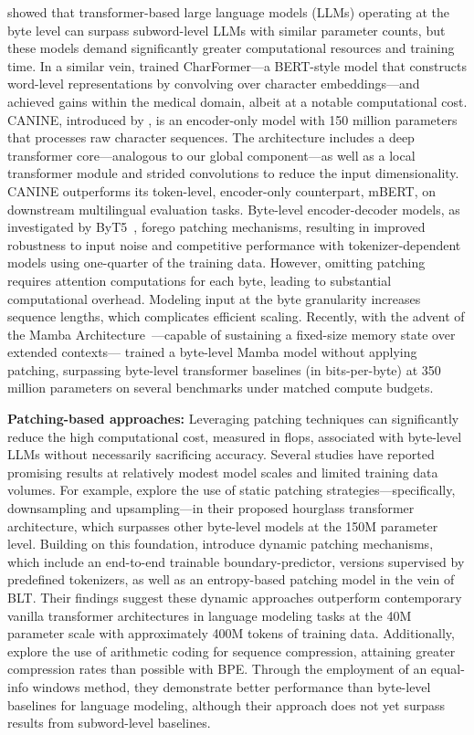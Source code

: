 \cite{Choe2019BridgingTG} showed that transformer-based large language models (LLMs) operating at the byte level can surpass subword-level LLMs with similar parameter counts, but these models demand significantly greater computational resources and training time. In a similar vein, \cite{el2020characterbert} trained CharFormer—a BERT-style model that constructs word-level representations by convolving over character embeddings—and achieved gains within the medical domain, albeit at a notable computational cost. CANINE, introduced by \cite{clark2022canine}, is an encoder-only model with 150 million parameters that processes raw character sequences. The architecture includes a deep transformer core—analogous to our global component—as well as a local transformer module and strided convolutions to reduce the input dimensionality. CANINE outperforms its token-level, encoder-only counterpart, mBERT, on downstream multilingual evaluation tasks. Byte-level encoder-decoder models, as investigated by ByT5~\citep{xue2022byt5}, forego patching mechanisms, resulting in improved robustness to input noise and competitive performance with tokenizer-dependent models using one-quarter of the training data. However, omitting patching requires attention computations for each byte, leading to substantial computational overhead. Modeling input at the byte granularity increases sequence lengths, which complicates efficient scaling. Recently, with the advent of the Mamba Architecture~\citep{gu2023mamba}—capable of sustaining a fixed-size memory state over extended contexts—\cite{wang2024mambabyte} trained a byte-level Mamba model without applying patching, surpassing byte-level transformer baselines (in bits-per-byte) at 350 million parameters on several benchmarks under matched compute budgets.

\textbf{Patching-based approaches:} Leveraging patching techniques can significantly reduce the high computational cost, measured in flops, associated with byte-level LLMs without necessarily sacrificing accuracy. Several studies have reported promising results at relatively modest model scales and limited training data volumes. For example, \cite{nawrot-etal-2022-hierarchical} explore the use of static patching strategies—specifically, downsampling and upsampling—in their proposed hourglass transformer architecture, which surpasses other byte-level models at the 150M parameter level. Building on this foundation, \cite{nawrot-etal-2023-efficient} introduce dynamic patching mechanisms, which include an end-to-end trainable boundary-predictor, versions supervised by predefined tokenizers, as well as an entropy-based patching model in the vein of {\textsc BLT}. Their findings suggest these dynamic approaches outperform contemporary vanilla transformer architectures in language modeling tasks at the 40M parameter scale with approximately 400M tokens of training data. Additionally, \cite{lester2024training} explore the use of arithmetic coding for sequence compression, attaining greater compression rates than possible with BPE. Through the employment of an equal-info windows method, they demonstrate better performance than byte-level baselines for language modeling, although their approach does not yet surpass results from subword-level baselines.

